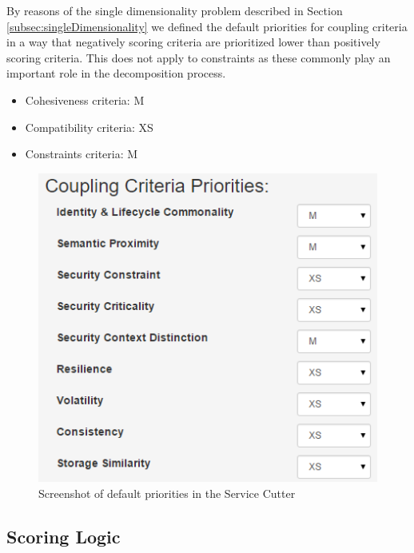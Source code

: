 \begin{minipage}[t]{0.5\textwidth}
\setlength{\parskip}{5pt plus 0.1pt}

By reasons of the single dimensionality problem described in Section \ref{subsec:singleDimensionality} we defined the default priorities for coupling criteria in a way that negatively scoring criteria are prioritized lower than positively scoring criteria. This does not apply to constraints as these commonly play an important role in the decomposition process. 

\begin{itemize}
\item Cohesiveness criteria: M
\item Compatibility criteria: XS
\item Constraints criteria: M
\end{itemize}

\end{minipage}
\begin{minipage}[t]{0.6\textwidth}
	\begin{figure}[H]
		\begin{center}
			\includegraphics[scale=0.5]{images/priorities.png}
			\caption{Screenshot of default priorities in the Service Cutter}
			\label{fig:priorities}
		\end{center}
	\end{figure}
\end{minipage}

\subsection{Scoring Logic}

